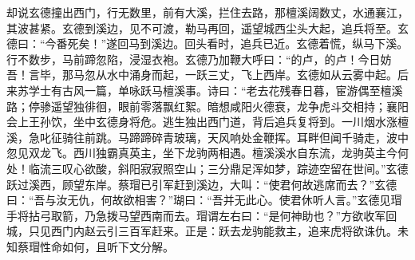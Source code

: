 却说玄德撞出西门，行无数里，前有大溪，拦住去路，那檀溪阔数丈，水通襄江，其波甚紧。玄德到溪边，见不可渡，勒马再回，遥望城西尘头大起，追兵将至。玄德曰：“今番死矣！”遂回马到溪边。回头看时，追兵已近。玄德着慌，纵马下溪。行不数步，马前蹄忽陷，浸湿衣袍。玄德乃加鞭大呼曰：“的卢，的卢！今日妨吾！言毕，那马忽从水中涌身而起，一跃三丈，飞上西岸。玄德如从云雾中起。后来苏学士有古风一篇，单咏跃马檀溪事。诗曰：“老去花残春日暮，宦游偶至檀溪路；停骖遥望独徘徊，眼前零落飘红絮。暗想咸阳火德衰，龙争虎斗交相持；襄阳会上王孙饮，坐中玄德身将危。逃生独出西门道，背后追兵复将到。一川烟水涨檀溪，急叱征骑往前跳。马蹄蹄碎青玻璃，天风响处金鞭挥。耳畔但闻千骑走，波中忽见双龙飞。西川独霸真英主，坐下龙驹两相遇。檀溪溪水自东流，龙驹英主今何处！临流三叹心欲酸，斜阳寂寂照空山；三分鼎足浑如梦，踪迹空留在世间。”玄德跃过溪西，顾望东岸。蔡瑁已引军赶到溪边，大叫：“使君何故逃席而去？”玄德曰：“吾与汝无仇，何故欲相害？”瑚曰：“吾并无此心。使君休听人言。”玄德见瑁手将拈弓取箭，乃急拨马望西南而去。瑁谓左右曰：“是何神助也？”方欲收军回城，只见西门内赵云引三百军赶来。正是：跃去龙驹能救主，追来虎将欲诛仇。未知蔡瑁性命如何，且听下文分解。